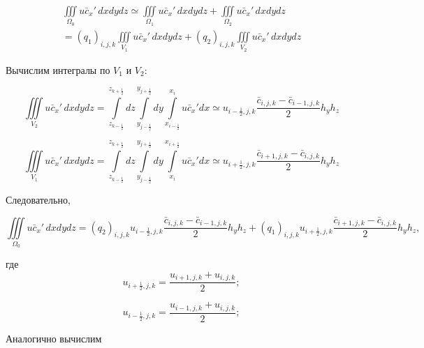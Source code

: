 \documentclass[12pt]{article}
\begin{document}
\begin{multline*}
\iiint\limits_{\Omega_0} u\bar{c}_x'\,dxdydz \simeq \iiint\limits_{\Omega_1} u\bar{c}_x'\,dxdydz + \iiint\limits_{\Omega_2} u\bar{c}_x'\,dxdydz \\  
= (q_1)_{i,j,k}\iiint\limits_{V_1} u\bar{c}_x'\,dxdydz + (q_2)_{i,j,k}\iiint\limits_{V_2} u\bar{c}_x'\,dxdydz
\end{multline*}

Вычислим интегралы по $V_1$ и $V_2$:

\begin{equation*}
	\iiint\limits_{V_2} u\bar{c}_x'\,dxdydz = \int\limits_{z_{k-\frac{1}{2}}}^{z_{k+\frac{1}{2}}}dz \int\limits_{y_{j-\frac{1}{2}}}^{y_{j+\frac{1}{2}}}dy   \int\limits_{x_{i-\frac{1}{2}}}^{x_{i}}u\bar{c}_x'dx \simeq u_{{i-\frac{1}{2}},j,k}\frac{\bar{c}_{i,j,k}-\bar{c}_{i-1,j,k}}{2}h_yh_z
\end{equation*}

\begin{equation*}
\iiint\limits_{V_1} u\bar{c}_x'\,dxdydz = \int\limits_{z_{k-\frac{1}{2}}}^{z_{k+\frac{1}{2}}}dz \int\limits_{y_{j-\frac{1}{2}}}^{y_{j+\frac{1}{2}}}dy   \int\limits_{x_i}^{x_{i+\frac{1}{2}}}u\bar{c}_x'dx \simeq u_{{i+\frac{1}{2}},j,k}\frac{\bar{c}_{i+1,j,k}-\bar{c}_{i,j,k}}{2}h_yh_z
\end{equation*}

Следовательно,

\begin{equation}
	\iiint\limits_{\Omega_0} u\bar{c}_x'\,dxdydz = (q_2)_{i,j,k}u_{{i-\frac{1}{2}},j,k}\frac{\bar{c}_{i,j,k}-\bar{c}_{i-1,j,k}}{2}h_yh_z +
	(q_1)_{i,j,k}u_{{i+\frac{1}{2}},j,k}\frac{\bar{c}_{i+1,j,k}-\bar{c}_{i,j,k}}{2}h_yh_z,
\end{equation}

где 
\begin{equation*} 
	u_{{i+\frac{1}{2}},j,k} = \frac{u_{i+1,j,k}+u_{i,j,k}}{2};
\end{equation*}

\begin{equation*} 
	u_{{i-\frac{1}{2}},j,k} = \frac{u_{i-1,j,k}+u_{i,j,k}}{2};
\end{equation*}


Аналогично вычислим
\end{document}
